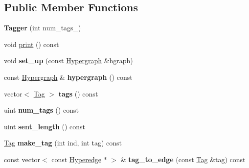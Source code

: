 \subsection*{Public Member Functions}
\begin{DoxyCompactItemize}
\item 
\hypertarget{classTagger_a6e812fd7e339a21155f7b30f04292be1}{
{\bfseries Tagger} (int num\_\-tags\_\-)}
\label{classTagger_a6e812fd7e339a21155f7b30f04292be1}

\item 
void \hyperlink{classTagger_a4ebe0aebd7c0392970b401a5a6c6cd72}{print} () const 
\item 
\hypertarget{classTagger_afafa6e435d17467db344ca615f24746f}{
void {\bfseries set\_\-up} (const \hyperlink{classHypergraph}{Hypergraph} \&hgraph)}
\label{classTagger_afafa6e435d17467db344ca615f24746f}

\item 
\hypertarget{classTagger_ad694ed218149b86c4ef5253328a41c49}{
const \hyperlink{classHypergraph}{Hypergraph} \& {\bfseries hypergraph} () const }
\label{classTagger_ad694ed218149b86c4ef5253328a41c49}

\item 
\hypertarget{classTagger_ae1e3802fb545c3430ca4d52ea5fd95db}{
vector$<$ \hyperlink{structTag}{Tag} $>$ {\bfseries tags} () const }
\label{classTagger_ae1e3802fb545c3430ca4d52ea5fd95db}

\item 
\hypertarget{classTagger_a5da221998377bf36c84013ba0d471b36}{
uint {\bfseries num\_\-tags} () const }
\label{classTagger_a5da221998377bf36c84013ba0d471b36}

\item 
\hypertarget{classTagger_ae762dd21f446b9ec618b0b83204bdc2e}{
uint {\bfseries sent\_\-length} () const }
\label{classTagger_ae762dd21f446b9ec618b0b83204bdc2e}

\item 
\hypertarget{classTagger_af01daf511528271a118a281b8595e0df}{
\hyperlink{structTag}{Tag} {\bfseries make\_\-tag} (int ind, int tag) const }
\label{classTagger_af01daf511528271a118a281b8595e0df}

\item 
\hypertarget{classTagger_a26472c386e7f5eebcb05c9d1843c1975}{
const vector$<$ const \hyperlink{classScarab_1_1HG_1_1Hyperedge}{Hyperedge} $\ast$ $>$ \& {\bfseries tag\_\-to\_\-edge} (const \hyperlink{structTag}{Tag} \&tag) const }
\label{classTagger_a26472c386e7f5eebcb05c9d1843c1975}


\end{DoxyCompactItemize}

